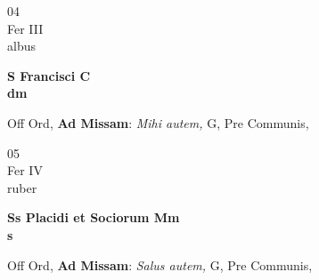 \documentclass[10pt, openany]{book}
\begin{document}
        \begin{center}
            \begin{minipage}{3.5in}
                \vspace{2em}
                \begin{minipage}{0.5in}
                    {\Huge 04} \\
                    {\normalsize Fer III} \\
                    {\normalsize albus}
                \end{minipage}
                \begin{minipage}{3.0in}
                    \textbf{ \large S Francisci C \\
                    \textnormal{\normalsize dm}} \\ 
                \end{minipage}
                \begin{justify}Off Ord, \textbf{Ad Missam}: \textit{Mihi autem,} G, Pre Communis,  
                \end{justify}
            \end{minipage}
        \end{center}
    
        \begin{center}
            \begin{minipage}{3.5in}
                \vspace{2em}
                \begin{minipage}{0.5in}
                    {\Huge 05} \\
                    {\normalsize Fer IV} \\
                    {\normalsize ruber}
                \end{minipage}
                \begin{minipage}{3.0in}
                    \textbf{ \large Ss Placidi et Sociorum Mm \\
                    \textnormal{\normalsize s}} \\ 
                \end{minipage}
                \begin{justify}Off Ord, \textbf{Ad Missam}: \textit{Salus autem,} G, Pre Communis,  
                \end{justify}
            \end{minipage}
        \end{center}
    
\end{document}
